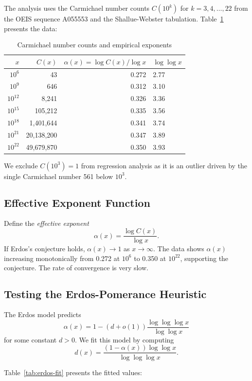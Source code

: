 \documentclass{amsart}
\theoremstyle{plain}
\theoremstyle{definition}
\theoremstyle{remark}
\begin{document}
The analysis uses the Carmichael number counts $C(10^k)$ for $k = 3, 4, \ldots, 22$ from the OEIS sequence A055553 and the Shallue-Webster tabulation. Table~\ref{tab:counts} presents the data:

\begin{table}[ht]
\centering
\caption{Carmichael number counts and empirical exponents}\label{tab:counts}
\begin{tabular}{rrrl}
\toprule
$x$ & $C(x)$ & $\alpha(x) = \log C(x) / \log x$ & $\log \log x$ \\
\midrule
$10^{6}$ & 43 & 0.272 & 2.77 \\
$10^{9}$ & 646 & 0.312 & 3.10 \\
$10^{12}$ & 8,241 & 0.326 & 3.36 \\
$10^{15}$ & 105,212 & 0.335 & 3.56 \\
$10^{18}$ & 1,401,644 & 0.341 & 3.74 \\
$10^{21}$ & 20,138,200 & 0.347 & 3.89 \\
$10^{22}$ & 49,679,870 & 0.350 & 3.93 \\
\bottomrule
\end{tabular}
\end{table}

We exclude $C(10^3) = 1$ from regression analysis as it is an outlier driven by the single Carmichael number 561 below $10^3$.

\subsection{Effective Exponent Function}

Define the \emph{effective exponent}
\[
\alpha(x) = \frac{\log C(x)}{\log x}.
\]
If Erdos's conjecture holds, $\alpha(x) \to 1$ as $x \to \infty$. The data shows $\alpha(x)$ increasing monotonically from 0.272 at $10^6$ to 0.350 at $10^{22}$, supporting the conjecture. The rate of convergence is very slow.

\subsection{Testing the Erdos-Pomerance Heuristic}

The Erdos model predicts
\[
\alpha(x) = 1 - (d + o(1)) \frac{\log \log \log x}{\log \log x}
\]
for some constant $d > 0$. We fit this model by computing
\[
d(x) = \frac{(1 - \alpha(x)) \log \log x}{\log \log \log x}.
\]

Table~\ref{tab:erdos-fit} presents the fitted values:
\end{document}
